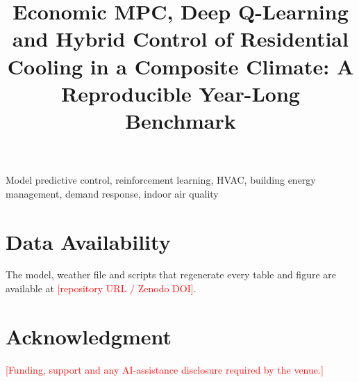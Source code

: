\documentclass[conference]{IEEEtran}
\begin{document}
\title{Economic MPC, Deep Q-Learning and Hybrid Control of Residential Cooling in a
Composite Climate: A Reproducible Year-Long Benchmark}

\author{
}

\maketitle

\begin{abstract}

\end{abstract}

\begin{IEEEkeywords}
Model predictive control, reinforcement learning, HVAC, building energy management,
demand response, indoor air quality
\end{IEEEkeywords}



\section*{Data Availability}
The model, weather file and scripts that regenerate every table and figure are
available at \textcolor{red}{[repository URL / Zenodo DOI]}.

\section*{Acknowledgment}
\textcolor{red}{[Funding, support and any AI-assistance disclosure required by the
venue.]}



\end{document}
